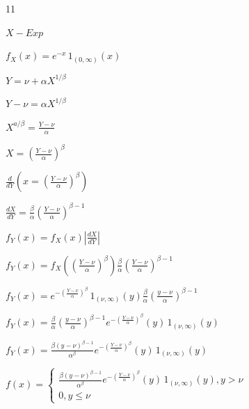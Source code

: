 \documentclass[12 pt]{article}
\begin{document}
    \begin{exercise}{11}
    \hfill

    $X - Exp$

    $f_X(x) = e^{-x} \, 1_{(0,\infty)} (x)$

    \hfill

    $Y = \nu +  \alpha X^{1/\beta}$

    $Y - \nu = \alpha X^{1/\beta}$

    $X^{a/\beta} = \frac{Y - \nu}{\alpha}$

    $X = (\frac{Y- \nu}{\alpha})^{\beta}$

    \hfill

    $\frac{d}{dY} (x = (\frac{Y - \nu}{\alpha})^{\beta})$

    $\frac{dX}{dY} = \frac{\beta}{\alpha} (\frac{Y - \nu}{\alpha})^{\beta -1}$

    \hfill

    $f_Y(x) = f_X(x)|\frac{dX}{dY}|$

    $f_Y(x) = f_X((\frac{Y - \nu}{\alpha})^\beta) \frac{\beta}{\alpha} (\frac{Y - \nu}{\alpha})^{\beta -1}$

    $f_Y(x) = e^{-(\frac{Y - \nu}{\alpha})^\beta} \, 1_{(\nu, \infty)} (y) \frac{\beta}{\alpha} (\frac{y - \nu}{\alpha})^{\beta -1}$

    $f_Y(x) = \frac{\beta}{\alpha}(\frac{y - \nu}{\alpha})^{\beta - 1} e^{-(\frac{Y-\nu}{\alpha})^\beta} (y) \, 1_{(\nu, \infty)} (y)$

    $f_Y(x) = \frac{\beta (y-\nu)^{\beta-1}}{{\alpha}^\beta} e^{-(\frac{Y-\nu}{\alpha})^\beta} (y) \, 1_{(\nu, \infty)} (y)$

    $ f(x) =\begin{cases}
    \frac{\beta (y-\nu)^{\beta-1}}{{\alpha}^\beta} e^{-(\frac{Y-\nu}{\alpha})^\beta} (y) \, 1_{(\nu, \infty)} (y), y > \nu \\
    0, y \leq \nu
    \end{cases}$

    \hfill
    \end{exercise}
\end{document}
